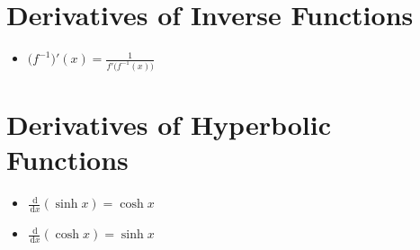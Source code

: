 \documentclass[12pt]{article}
\newcommand{\dd}{\, \mathrm{d}}
\begin{document}
\section*{Derivatives of Inverse Functions}
\begin{itemize}
    \item $\displaystyle \bigl(f^{-1}\bigr)'(x) = \frac{1}{f'\bigl(f^{-1}(x)\bigr)}$
\end{itemize}

\section*{Derivatives of Hyperbolic Functions}
\begin{itemize}
    \item $\displaystyle \frac{\dd}{\dd x}(\sinh x) = \cosh x$
    \item $\displaystyle \frac{\dd}{\dd x}(\cosh x) = \sinh x$
\end{itemize}
\end{document}
